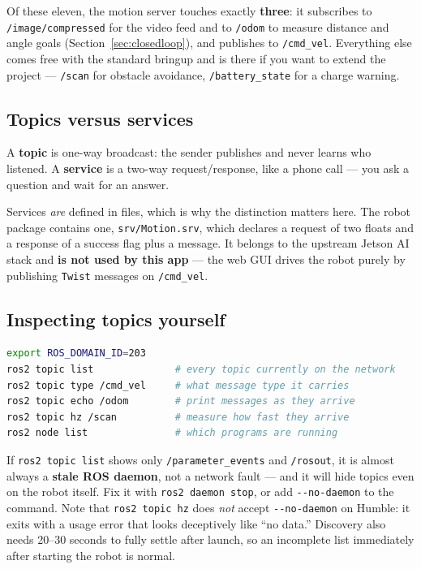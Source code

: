 \documentclass[11pt,a4paper]{article}
\newcommand{\code}[1]{\texttt{#1}}
\newenvironment{warnbox}%
  {\par\medskip\begin{lrbox}{\warnboxsave}%
   \begin{minipage}{\dimexpr\linewidth-2\fboxsep-2\fboxrule\relax}}%
  {\end{minipage}\end{lrbox}%
   \noindent\fcolorbox{warnrule}{warnbg}{\usebox{\warnboxsave}}\par\medskip}
\begin{document}
Of these eleven, the motion server touches exactly \textbf{three}: it subscribes
to \code{/image/compressed} for the video feed and to \code{/odom} to measure
distance and angle goals (Section~\ref{sec:closedloop}), and publishes to
\code{/cmd\_vel}. Everything else comes free with the standard bringup and is
there if you want to extend the project --- \code{/scan} for obstacle avoidance,
\code{/battery\_state} for a charge warning.

\subsection{Topics versus services}
A \textbf{topic} is one-way broadcast: the sender publishes and never learns who
listened. A \textbf{service} is a two-way request/response, like a phone call ---
you ask a question and wait for an answer.

Services \emph{are} defined in files, which is why the distinction matters here.
The robot package contains one, \code{srv/Motion.srv}, which declares a request
of two floats and a response of a success flag plus a message. It belongs to
the upstream Jetson AI stack and \textbf{is not used by this app} --- the web
GUI drives the robot purely by publishing \code{Twist} messages on
\code{/cmd\_vel}.

\subsection{Inspecting topics yourself}
\begin{lstlisting}[language=bash]
export ROS_DOMAIN_ID=203
ros2 topic list              # every topic currently on the network
ros2 topic type /cmd_vel     # what message type it carries
ros2 topic echo /odom        # print messages as they arrive
ros2 topic hz /scan          # measure how fast they arrive
ros2 node list               # which programs are running
\end{lstlisting}

\begin{warnbox}
If \code{ros2 topic list} shows only \code{/parameter\_events} and
\code{/rosout}, it is almost always a \textbf{stale ROS daemon}, not a network
fault --- and it will hide topics even on the robot itself. Fix it with
\code{ros2 daemon stop}, or add \code{-{}-no-daemon} to the command. Note that
\code{ros2 topic hz} does \emph{not} accept \code{-{}-no-daemon} on Humble: it
exits with a usage error that looks deceptively like ``no data.'' Discovery
also needs 20--30 seconds to fully settle after launch, so an incomplete list
immediately after starting the robot is normal.
\end{warnbox}
\end{document}

